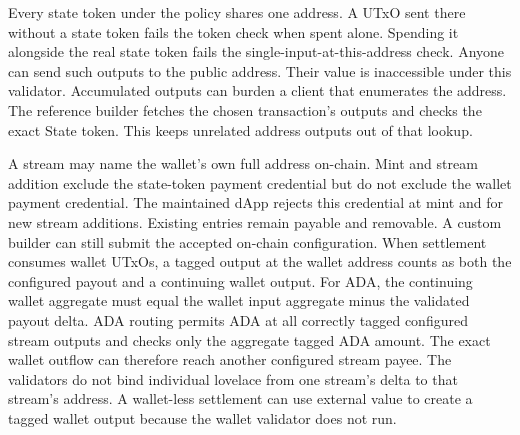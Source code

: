 \begin{description}[leftmargin=1.4em,style=nextline]
\item[Only token-bearing outputs at the state-token address are spendable.] Every state token under the policy shares one address. A UTxO sent there without a state token fails the token check when spent alone. Spending it alongside the real state token fails the single-input-at-this-address check. Anyone can send such outputs to the public address. Their value is inaccessible under this validator. Accumulated outputs can burden a client that enumerates the address. The reference builder fetches the chosen transaction's outputs and checks the exact State token. This keeps unrelated address outputs out of that lookup.
\item[Self-addressed streams.] A stream may name the wallet's own full address on-chain. Mint and stream addition exclude the state-token payment credential but do not exclude the wallet payment credential. The maintained dApp rejects this credential at mint and for new stream additions. Existing entries remain payable and removable. A custom builder can still submit the accepted on-chain configuration. When settlement consumes wallet UTxOs, a tagged output at the wallet address counts as both the configured payout and a continuing wallet output. For ADA, the continuing wallet aggregate must equal the wallet input aggregate minus the validated payout delta. ADA routing permits ADA at all correctly tagged configured stream outputs and checks only the aggregate tagged ADA amount. The exact wallet outflow can therefore reach another configured stream payee. The validators do not bind individual lovelace from one stream's delta to that stream's address. A wallet-less settlement can use external value to create a tagged wallet output because the wallet validator does not run.


\end{description}
